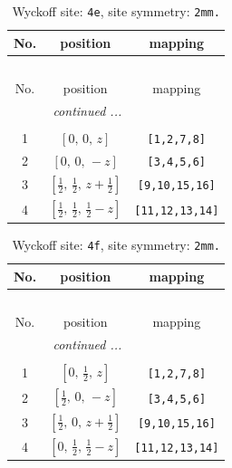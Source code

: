 \documentclass[fleqn,8pt]{jsarticle}
\begin{document}
\begin{longtable}{ccc}
\caption{Wyckoff site: {\tt 4e}, site symmetry: {\tt 2mm.}}
 \\
 \hline \hline
No. & position & mapping \\ \hline \endfirsthead

\multicolumn{2}{l}{\tablename\ \thetable{}} \\
 \hline \hline
No. & position & mapping \\ \hline \endhead

 \hline \hline
\multicolumn{2}{r}{\footnotesize\it continued ...} \\ \endfoot

 \hline \hline
\multicolumn{2}{r}{} \\ \endlastfoot

1 & $\left[ 0,\, 0,\, z \right]$ & {\tt [1,2,7,8]} \\ \hline
2 & $\left[ 0,\, 0,\, - z \right]$ & {\tt [3,4,5,6]} \\ \hline
3 & $\left[ \frac{1}{2},\, \frac{1}{2},\, z + \frac{1}{2} \right]$ & {\tt [9,10,15,16]} \\ \hline
4 & $\left[ \frac{1}{2},\, \frac{1}{2},\, \frac{1}{2} - z \right]$ & {\tt [11,12,13,14]} \\
\end{longtable}
\renewcommand{\arraystretch}{1.2}
\begin{longtable}{ccc}
\caption{Wyckoff site: {\tt 4f}, site symmetry: {\tt 2mm.}}
 \\
 \hline \hline
No. & position & mapping \\ \hline \endfirsthead

\multicolumn{2}{l}{\tablename\ \thetable{}} \\
 \hline \hline
No. & position & mapping \\ \hline \endhead

 \hline \hline
\multicolumn{2}{r}{\footnotesize\it continued ...} \\ \endfoot

 \hline \hline
\multicolumn{2}{r}{} \\ \endlastfoot

1 & $\left[ 0,\, \frac{1}{2},\, z \right]$ & {\tt [1,2,7,8]} \\ \hline
2 & $\left[ \frac{1}{2},\, 0,\, - z \right]$ & {\tt [3,4,5,6]} \\ \hline
3 & $\left[ \frac{1}{2},\, 0,\, z + \frac{1}{2} \right]$ & {\tt [9,10,15,16]} \\ \hline
4 & $\left[ 0,\, \frac{1}{2},\, \frac{1}{2} - z \right]$ & {\tt [11,12,13,14]} \\
\end{longtable}
\end{document}
